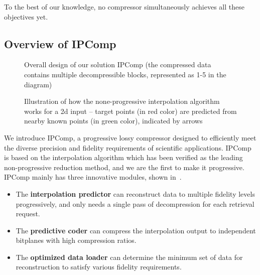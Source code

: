 To the best of our knowledge, no compressor simultaneously achieves all these objectives yet.

\subsection{Overview of IPComp}


\begin{figure}[ht]
\vspace{-2mm}
\centering
\caption{Overall design of our solution IPComp (the compressed data contains multiple decompressible blocks, represented as 1-5 in the diagram)}
\label{fig:overall-design}
\end{figure}



\begin{figure*}[ht]
\centering
\vspace{-2mm}
\caption{Illustration of how the none-progressive interpolation algorithm works for a 2d input -- target points (in red color) are predicted from nearby known points (in green color), indicated by arrows}
\label{fig:interp-design}
\vspace{-2mm}
\end{figure*}

We introduce IPComp, a progressive lossy compressor designed to efficiently meet the diverse precision and fidelity requirements of scientific applications. IPComp is based on the interpolation algorithm which has been verified as the leading non-progressive reduction method, and we are the first to make it progressive. IPComp mainly has three innovative modules, shown in~.
\begin{itemize}
    \item The \textbf{interpolation predictor} can reconstruct data to multiple fidelity levels progressively, and only needs a single pass of decompression for each retrieval request.
    \item The \textbf{predictive coder} can compress the interpolation output to independent bitplanes with high compression ratios.
    \item The \textbf{optimized data loader} can determine the minimum set of data for reconstruction to satisfy various fidelity requirements.
\end{itemize}


